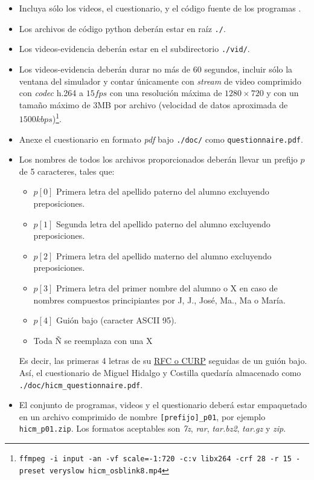 \documentclass[letterpaper,10.5pt]{article}
\begin{document}
\begin{itemize}[noitemsep]
	\item Incluya sólo los videos, el cuestionario, y el código fuente de los programas .
	\item Los archivos de código python deberán estar en raíz \texttt{./}.
	\item Los videos-evidencia deberán estar en el subdirectorio \texttt{./vid/}.
	\item Los videos-evidencia deberán durar no más de 60 segundos, incluir sólo la ventana del simulador y contar únicamente con \emph{stream} de video comprimido con \emph{codec} h.264 a \(15fps\) con una resolución máxima de \(1280 \times 720\) y con un tamaño máximo de 3MB por archivo (velocidad de datos aproximada de \(1500kbps\))\footnote{\texttt{ffmpeg -i input -an -vf scale=-1:720 -c:v libx264 -crf 28 -r 15 -preset veryslow hicm\_osblink8.mp4}}.
	\item Anexe el cuestionario en formato \emph{pdf} bajo \texttt{./doc/} como \texttt{questionnaire.pdf}.
	\item Los nombres de todos los archivos proporcionados deberán llevar un prefijo \(p\) de 5 caracteres, tales que:
	\begin{itemize}[noitemsep]
		\item \textbf{\(p[0]\)} Primera letra del apellido paterno del alumno excluyendo preposiciones.
		\item \textbf{\(p[1]\)} Segunda letra del apellido paterno del alumno excluyendo preposiciones.
		\item \textbf{\(p[2]\)} Primera letra del apellido materno del alumno excluyendo preposiciones.
		\item \textbf{\(p[3]\)} Primera letra del primer nombre del alumno o X en caso de nombres compuestos principiantes por J, J., José, Ma., Ma o María.
		\item \textbf{\(p[4]\)} Guión bajo (caracter ASCII 95).
		\item Toda Ñ se reemplaza con una X
	\end{itemize}
	Es decir, las primeras 4 letras de su \href{http://www.renapo.gob.mx/RENAPOPortal/docs/InstructivoParaLaCurp.pdf}{RFC o CURP} seguidas de un guión bajo.
	Así, el cuestionario de Miguel Hidalgo y Costilla quedaría almacenado como \texttt{./doc/hicm\_questionnaire.pdf}.
	\item El conjunto de programas, videos y el questionario deberá estar empaquetado en un archivo comprimido de nombre \texttt{[prefijo]\_p01}, por ejemplo \texttt{hicm\_p01.zip}.
	Los formatos aceptables son \emph{7z}, \emph{rar}, \emph{tar.bz2}, \emph{tar.gz} y \emph{zip}.
\end{itemize}
\end{document}
